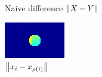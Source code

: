 \documentclass{beamer}
\begin{document}
\begin{frame}
\begin{figure}
\begin{minipage}[b]{0.40\linewidth}
      \caption{Naive difference $\left\lVert X-Y\right\rVert$}
    \end{minipage}
    \hfill
    \begin{minipage}[b]{0.40\linewidth}
      \centering
      \includegraphics[width=\textwidth]{./Images/GraphMatch/normMap.png}
      \caption{$\left\lVert x_i - x_{\rho(i)}\right\rVert$}
    \end{minipage}
  \end{figure}
\end{frame}


\end{document}
